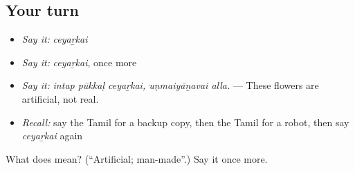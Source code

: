 \subsection*{Your turn}
\begin{itemize}
\raggedright
  \item \emph{Say it:} \emph{ceyaṟkai}
  \item \emph{Say it:} \emph{ceyaṟkai}, once more
  \item \emph{Say it:} \emph{intap pūkkaḷ ceyaṟkai, uṇmaiyāṉavai alla.} — These flowers are artificial, not real.
  \item \emph{Recall:} say the Tamil for a backup copy, then the Tamil for a robot, then say \emph{ceyaṟkai} again
\end{itemize}

\begin{tcolorbox}[breakable,colback=teal!4,colframe=teal!35!black,title={Before you move on}]
What does  mean? (\textquotedblleft{}Artificial; man-made\textquotedblright{}.) Say it once more.
\end{tcolorbox}
